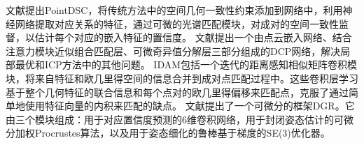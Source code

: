     文献\cite{PointDSC}提出PointDSC，将传统方法中的空间几何一致性约束添加到网络中，利用神经网络提取对应关系的特征，通过可微的光谱匹配模块，对成对的空间一致性监督，以估计每个对应的嵌入特征的置信度。
    文献\cite{DCP}提出一个由点云嵌入网络、结合注意力模块近似组合匹配层、可微奇异值分解层三部分组成的DCP网络，解决局部最优和ICP方法中的其他问题。
    IDAM包括一个迭代的距离感知相似矩阵卷积模块，将来自特征和欧几里得空间的信息合并到成对点匹配过程中。这些卷积层学习基于整个几何特征的联合信息和每个点对的欧几里得偏移来匹配点，克服了通过简单地使用特征向量的内积来匹配的缺点。
    文献\cite{DGR}提出了一个可微分的框架DGR。它由三个模块组成：用于对应置信度预测的6维卷积网络，用于封闭姿态估计的可微分加权Procrustes算法，以及用于姿态细化的鲁棒基于梯度的SE(3)优化器。
